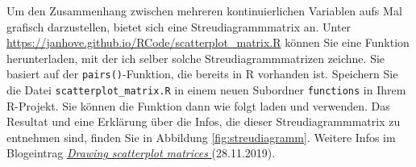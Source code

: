\documentclass[oneside, 10pt]{book}\usepackage[]{graphicx}\usepackage[]{xcolor}
\begin{document}
Um den Zusammenhang zwischen mehreren kontinuierlichen Variablen
aufs Mal grafisch darzustellen, bietet sich eine Streudiagrammmatrix
an. Unter
\url{https://janhove.github.io/RCode/scatterplot_matrix.R}
können Sie eine Funktion herunterladen, mit der ich selber solche Streu\-diagramm\-matrizen
zeichne. Sie basiert auf der \texttt{pairs()}-Funktion, die bereits in R
vorhanden ist.
Speichern Sie die Datei \texttt{scatterplot\_matrix.R} in einem neuen Subordner \texttt{functions}
in Ihrem R-Projekt. Sie können die Funktion dann wie folgt laden
und verwenden. Das Resultat und eine Erklärung über die Infos,
die dieser Streudiagrammmatrix zu entnehmen sind, finden Sie
in Abbildung \ref{fig:streudiagramm}. Weitere Infos im Blogeintrag
\href{https://janhove.github.io/reporting/2019/11/28/scatterplot-matrix}{\textit{Drawing scatterplot matrices
}} (28.11.2019).
\end{document}
